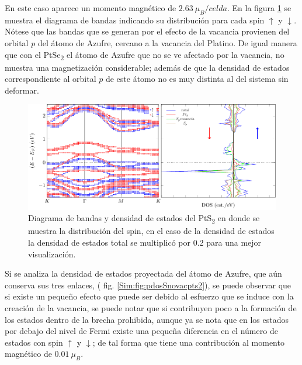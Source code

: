 En este caso aparece un momento magn\'etico de $2.63 ~ \mu_{B}/celda$. En la figura \ref{Sim:fig:noSOCpts2def} se muestra el diagrama de bandas indicando su distribuci\'on  para cada spin $\uparrow$ y $\downarrow$. N\'otese que las bandas que se generan por el efecto de la vacancia provienen del orbital $p$ del \'atomo de Azufre, cercano a la vacancia del Platino. De igual manera que con el PtSe\textsubscript{2} el \'atomo de Azufre que no se ve afectado por la vacancia, no muestra una magnetizaci\'on considerable; adem\'as de que la densidad de estados correspondiente al orbital $p$ de este \'atomo no es muy distinta al del sistema sin deformar.
\newline

\begin{figure}[!hbt]
	\centering
	\includegraphics[scale=0.9]{figRes/PtS2/def/bandas/nosoc/bandasDOSnoSoc.pdf}
	\caption[Diagrama de bandas y densidad de estados del PtS\textsubscript{2} con una vacancia de Platino.]{Diagrama de bandas y densidad de estados del PtS\textsubscript{2} en donde se muestra la distribuci\'on del spin, en el caso de la densidad de estados la densidad de estados total se multiplic\'o por 0.2 para una mejor visualizaci\'on.  }
	\label{Sim:fig:noSOCpts2def}
\end{figure}
Si se analiza la densidad de estados proyectada del \'atomo de Azufre, que a\'un conserva sus tres  enlaces,  ( fig.  \ref{Sim:fig:pdosSnovacpts2}),   se puede observar que si existe un peque\~no efecto que puede ser debido al esfuerzo que se induce con la creaci\'on de la vacancia, se puede notar que si contribuyen poco a la formaci\'on de los estados dentro de la brecha prohibida, aunque ya se nota que en los estados por debajo del nivel de Fermi existe una peque\~na diferencia en el n\'umero de estados con spin $\uparrow$ y $\downarrow$; de tal forma que tiene una contribuci\'on al momento magn\'etico de $0.01 ~\mu_{B}$.
